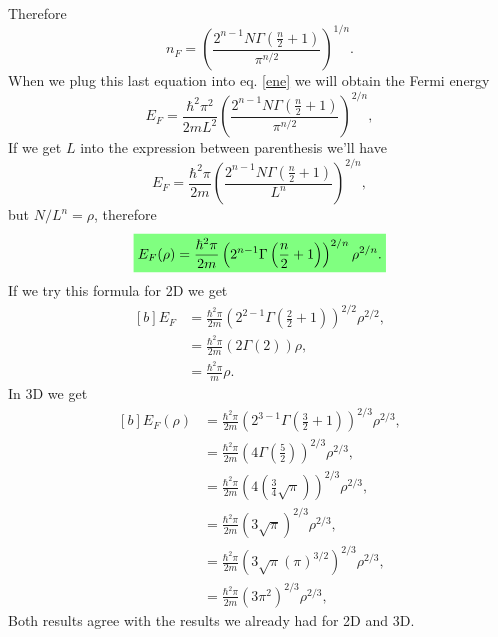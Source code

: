 \begin{questions}
\begin{solution}
   Therefore
   \begin{equation}
     n_F =  \left(\frac{2^{n-1}N\Gamma \left(\frac{n}{2} + 1 \right)}{\pi^{n/2}} \right)^{1/n}.
   \end{equation}
   When we plug this last equation into eq. \ref{ene} we will obtain the Fermi energy
   \begin{equation}
     E_F = \frac{\hbar^2\pi^2}{2mL^2}\left(\frac{2^{n-1}N\Gamma \left(\frac{n}{2} + 1 \right)}{\pi^{n/2}} \right)^{2/n},
   \end{equation}
   If we get $L$ into the expression between parenthesis we'll have
   \begin{equation}
     E_F = \frac{\hbar^2\pi}{2m}\left(\frac{2^{n-1}N\Gamma \left(\frac{n}{2} + 1 \right)}{L^n} \right)^{2/n},
   \end{equation}
   but $N/L^n = \rho$, therefore
   \begin{equation}
     \hlgreen{E_F(\rho) = \frac{\hbar^2\pi}{2m}\left(2^{n-1}\Gamma \left(\frac{n}{2} + 1 \right) \right)^{2/n}\rho ^{2/n}.}
   \end{equation}
   If we try this formula for 2D we get
\begin{equation}
  \begin{aligned}[b]
    E_F &= \frac{\hbar^2\pi}{2m}\left(2^{2-1}\Gamma \left(\frac{2}{2} + 1 \right) \right)^{2/2}\rho ^{2/2},\\
    &=\frac{\hbar^2\pi}{2m}\left(2\Gamma \left(2 \right) \right)\rho,\\
    &=\frac{\hbar^2\pi}{m}\rho.
  \end{aligned}
\end{equation}
In 3D we get
\begin{equation}
  \begin{aligned}[b]
    E_F(\rho) &= \frac{\hbar^2\pi}{2m}\left(2^{3-1}\Gamma \left(\frac{3}{2} + 1 \right) \right)^{2/3}\rho ^{2/3},\\
    &= \frac{\hbar^2\pi}{2m}\left(4\Gamma \left(\frac{5}{2} \right) \right)^{2/3}\rho ^{2/3},\\
    &= \frac{\hbar^2\pi}{2m}\left(4 \left(\frac{3}{4}\sqrt{\pi} \right) \right)^{2/3}\rho ^{2/3},\\
    &= \frac{\hbar^2\pi}{2m}\left(3\sqrt{\pi}  \right)^{2/3}\rho ^{2/3},\\
    &= \frac{\hbar^2\pi}{2m}\left(3\sqrt{\pi} (\pi)^{3/2} \right)^{2/3}\rho ^{2/3},\\
    &= \frac{\hbar^2\pi}{2m}\left(3\pi^{2} \right)^{2/3}\rho ^{2/3},
  \end{aligned}
\end{equation}
  Both results agree with the results we already had for 2D and 3D.
 \end{solution}

\end{questions}

%
%
